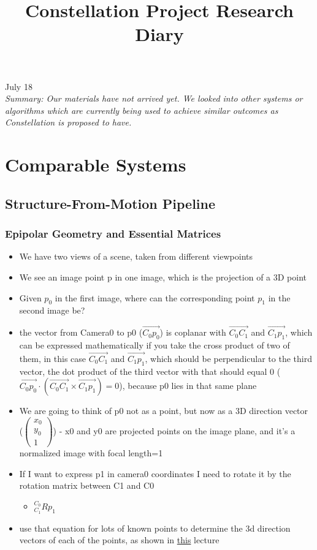 \documentclass[11pt,letterpaper]{article}
\begin{document}
\title{Constellation Project Research Diary}

{\Huge July 18}\\[5mm]

\textit{Summary: Our materials have not arrived yet. We looked into other systems or algorithms which are currently being used to achieve similar outcomes as Constellation is proposed to have.}

\section{Comparable Systems}

\subsection{Structure-From-Motion Pipeline}
\subsubsection{Epipolar Geometry and Essential Matrices}
\begin{itemize}
\item We have two views of a scene, taken from different viewpoints
\item We see an image point p in one image, which is the projection of a 3D point
\item Given $p_0$ in the first image, where can the corresponding point $p_1$ in the second image be?
\item the vector from Camera0 to p0 ($\vec{C_0p_0}$) is coplanar with $\vec{C_0C_1}$ and $\vec{C_1p_1}$, which can be expressed mathematically if you take the cross product of two of them, in this case $\vec{C_0C_1}$ and $\vec{C_1p_1}$, which should be perpendicular to the third vector, the dot product of the third vector with that should equal 0 ($\vec{C_0p_0}\cdot(\vec{C_0C_1}\times\vec{C_1p_1})=0$), because p0 lies in that same plane
\item We are going to think of p0 not as a point, but now as a 3D direction vector ($\begin{pmatrix}x_0 \\ y_0\\ 1\end{pmatrix}$) - x0 and y0 are projected points on the image plane, and it's a normalized image with focal length=1
\item If I want to express p1 in camera0 coordinates I need to rotate it by the rotation matrix between C1 and C0
\begin{itemize}
\item $^{C_0}_{C_1}Rp_1$
\end{itemize}
\item use that equation for lots of known points to determine the 3d direction vectors of each of the points, as shown in \href{https://www.youtube.com/watch?v=kfN76APa4HE}{this} lecture
\end{itemize}
\end{document}
